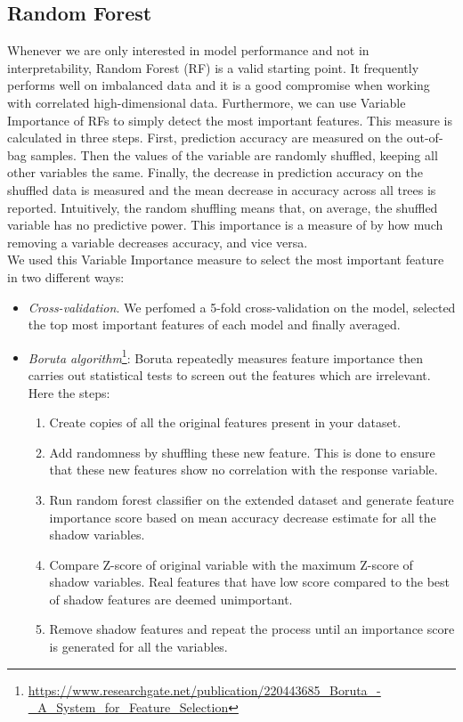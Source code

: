 \documentclass[a4paper,11pt, oneside]{article}  %
\begin{document}
	\subsection{Random Forest}
	Whenever we are only interested in model performance and not in interpretability, Random Forest (RF) is a valid starting point. It frequently performs well on imbalanced data and it is a good compromise when working with correlated high-dimensional data. Furthermore, we can use Variable Importance of RFs to simply detect the most important features. This measure is calculated in three steps. First, prediction accuracy are measured on the out-of-bag samples. Then the values of the variable are randomly shuffled, keeping all other variables the same. Finally, the decrease in prediction accuracy on the shuffled data is measured and the mean decrease in accuracy across all trees is reported. Intuitively, the random shuffling means that, on average, the shuffled variable has no predictive power. This importance is a measure of by how much removing a variable decreases accuracy, and vice versa. \\
	We used this Variable Importance measure to select the most important feature in two different ways:
	
	\begin{itemize}
		\item \textit{Cross-validation}. We perfomed a 5-fold cross-validation on the model, selected the top most important features of each model and finally averaged.
		\item \textit{Boruta algorithm}\footnote{\url{https://www.researchgate.net/publication/220443685_Boruta_-_A_System_for_Feature_Selection}}: Boruta repeatedly measures feature importance then carries out statistical tests to screen out the features which are irrelevant. Here the steps:
		\begin{enumerate}
			\item Create copies of all the original features present in your dataset.
			\item Add randomness by shuffling these new feature. This is done to ensure that these new features show no correlation with the response variable.
			\item Run random forest classifier on the extended dataset and generate feature importance score based on mean accuracy decrease estimate for all the shadow variables.
			\item Compare Z-score of original variable with the maximum Z-score of shadow variables. Real features that have low score compared to the best of shadow features are deemed unimportant.
			\item Remove shadow features and repeat the process until an importance score is generated for all the variables.
		\end{enumerate}
	\end{itemize}
	
\end{document}
